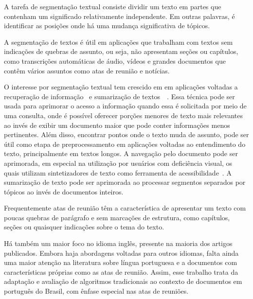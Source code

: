 A tarefa de segmentação textual consiste dividir um texto em partes que contenham um significado relativamente independente. Em outras palavras, é identificar as posições onde há uma mudança significativa de tópicos. 

A segmentação de textos é útil em aplicações que trabalham com textos sem indicações de quebras de assunto, ou seja, não apresentam seções ou capítulos, como transcrições automáticas de áudio, vídeos e grandes documentos que contêm vários assuntos como atas de reunião e notícias.


O interesse por segmentação textual tem crescido em em aplicações voltadas a recuperação de informação~\cite{Reynar1999} %
e sumarização de textos~\cite{Boguraev2000}~\cite{Boguraev2000b}. %
Essa técnica pode ser usada para aprimorar o acesso a informação quando essa é solicitada por meio de uma consulta, onde é possível oferecer porções menores de texto mais relevantes ao invés de exibir um documento maior que pode conter informações menos pertinentes. 
%
Além disso, encontrar pontos onde o texto muda de assunto, pode ser útil como etapa de preprocessamento em aplicações voltadas ao entendimento do texto, principalmente em textos longos.
%
A navegação pelo documento pode ser aprimorada, em especial na utilização por usuários com deficiência visual, os quais utilizam  sintetizadores de texto como ferramenta de acessibilidade~\cite{Choi2000}. 
%
A sumarização de texto pode ser aprimorada ao processar segmentos separados por tópicos ao invés de documentos inteiros. 



%
Frequentemente atas de reunião têm a característica de apresentar um texto com poucas quebras de parágrafo e sem marcações de estrutura, como capítulos, seções ou quaisquer indicações sobre o tema do texto. 
%


Há também um maior foco no idioma inglês, presente na maioria dos artigos publicados. Embora haja abordagens voltadas para outros idiomas, falta ainda uma maior atenção na literatura sobre língua portuguesa e a documentos com características próprias como as atas de reunião.
%
%
%
Assim, esse trabalho trata da adaptação e avaliação de algoritmos tradicionais ao contexto de documentos em português do Brasil, com ênfase especial nas atas de reuniões.

